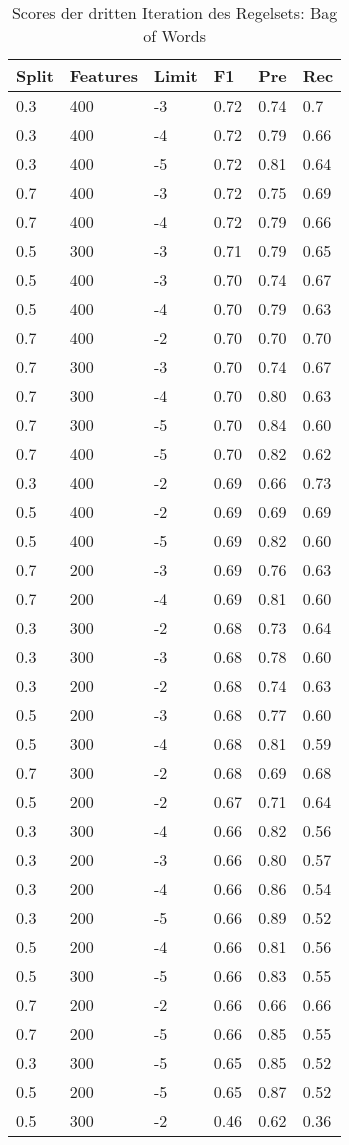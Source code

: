 \begin{table}
	\caption{Scores der dritten Iteration des Regelsets: Bag of Words}
	\centering
\begin{tabular}{ | l | l | l | l | l | l | }
	\hline
	Split & Features & Limit & F1 & Pre & Rec \\ \hline
	0.3 & 400 & -3 & 0.72 & 0.74 & 0.7 \\ 
	0.3 & 400 & -4 & 0.72 & 0.79 & 0.66 \\
	0.3 & 400 & -5 & 0.72 & 0.81 & 0.64 \\
	0.7 & 400 & -3 & 0.72 & 0.75 & 0.69 \\
	0.7 & 400 & -4 & 0.72 & 0.79 & 0.66 \\
	0.5 & 300 & -3 & 0.71 & 0.79 & 0.65 \\
	0.5 & 400 & -3 & 0.70 & 0.74 & 0.67 \\
	0.5 & 400 & -4 & 0.70 & 0.79 & 0.63 \\ 
	0.7 & 400 & -2 & 0.70 & 0.70 & 0.70 \\ 
	0.7 & 300 & -3 & 0.70 & 0.74 & 0.67 \\
	0.7 & 300 & -4 & 0.70 & 0.80 & 0.63 \\
	0.7 & 300 & -5 & 0.70 & 0.84 & 0.60 \\
	0.7 & 400 & -5 & 0.70 & 0.82 & 0.62 \\ 
	0.3 & 400 & -2 & 0.69 & 0.66 & 0.73 \\ 
	0.5 & 400 & -2 & 0.69 & 0.69 & 0.69 \\ 
	0.5 & 400 & -5 & 0.69 & 0.82 & 0.60 \\ 
	0.7 & 200 & -3 & 0.69 & 0.76 & 0.63 \\ 
	0.7 & 200 & -4 & 0.69 & 0.81 & 0.60 \\ 
	0.3 & 300 & -2 & 0.68 & 0.73 & 0.64 \\ 
	0.3 & 300 & -3 & 0.68 & 0.78 & 0.60 \\ 
	0.3 & 200 & -2 & 0.68 & 0.74 & 0.63 \\ 
	0.5 & 200 & -3 & 0.68 & 0.77 & 0.60 \\ 
	0.5 & 300 & -4 & 0.68 & 0.81 & 0.59 \\ 
	0.7 & 300 & -2 & 0.68 & 0.69 & 0.68 \\ 
	0.5 & 200 & -2 & 0.67 & 0.71 & 0.64 \\ 
	0.3 & 300 & -4 & 0.66 & 0.82 & 0.56 \\ 
	0.3 & 200 & -3 & 0.66 & 0.80 & 0.57 \\
	0.3 & 200 & -4 & 0.66 & 0.86 & 0.54 \\
	0.3 & 200 & -5 & 0.66 & 0.89 & 0.52 \\ 
	0.5 & 200 & -4 & 0.66 & 0.81 & 0.56 \\
	0.5 & 300 & -5 & 0.66 & 0.83 & 0.55 \\ 
	0.7 & 200 & -2 & 0.66 & 0.66 & 0.66 \\ 
	0.7 & 200 & -5 & 0.66 & 0.85 & 0.55 \\ 
	0.3 & 300 & -5 & 0.65 & 0.85 & 0.52 \\ 
	0.5 & 200 & -5 & 0.65 & 0.87 & 0.52 \\
	0.5 & 300 & -2 & 0.46 & 0.62 & 0.36 \\ \hline
\end{tabular}
\end{table}\\
